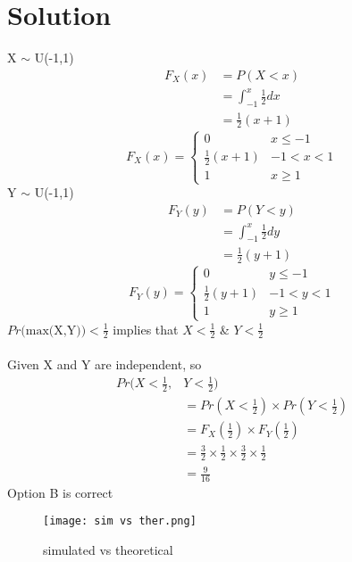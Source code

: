 \documentclass[journal,12pt,twocolumn]{IEEEtran}
\begin{document}
\section{Solution}
X \(\sim\) U(-1,1)
\begin{align}
  F_{X}(x)&=P(X<x)\\
  &=\int_{-1}^x\frac{1}{2}dx\\
  &=\frac{1}{2}(x+1)
\end{align}
\begin{equation}
F_X(x)=
    \begin{cases}
    0 & x\leq-1\\
    \frac{1}{2}(x+1) & -1<x<1\\
    1 & x\geq1
    \end{cases}
\end{equation}
Y \(\sim\) U(-1,1)
\begin{align}
      F_{Y}(y)&=P(Y<y)\\
  &=\int_{-1}^x\frac{1}{2}dy\\
  &=\frac{1}{2}(y+1)
\end{align}
\begin{equation}
F_Y(y)=
    \begin{cases}
    0 & y\leq-1\\
    \frac{1}{2}(y+1) & -1<y<1\\
    1 & y\geq1
    \end{cases}
\end{equation}
\(Pr\Big(\text{max(X,Y)}\Big)<\frac{1}{2}\) implies that
\(X<\frac{1}{2}\) \& \(Y<\frac{1}{2}\)\\
\\Given X and Y are independent, so
\begin{align}
    Pr(X<\frac{1}{2},&Y<\frac{1}{2})\\
    &=Pr(X<\frac{1}{2})\times Pr(Y<\frac{1}{2})\\
    &=F_X(\frac{1}{2}) \times F_Y(\frac{1}{2})\\
   &=\frac{3}{2}\times\frac{1}{2}\times\frac{3}{2}\times\frac{1}{2}\\
    &=\frac{9}{16}
\end{align}
Option B is correct
\begin{figure}[h!]
    \centering
    \texttt{[image: sim vs ther.png]}
    \caption{simulated vs theoretical}
    \label{fig:my_label}
\end{figure}
\end{document}
